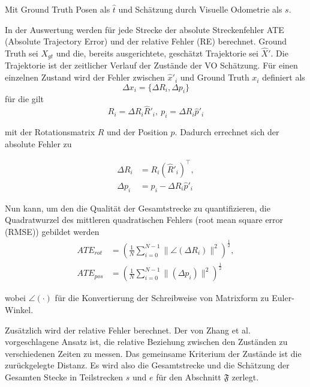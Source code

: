 Mit Ground Truth Posen als $\hat{t}$ und Schätzung durch Visuelle Odometrie als $s$. 
\newline

In der Auswertung werden für jede Strecke der absolute Streckenfehler ATE (Absolute Trajectory Error) und der relative Fehler (RE) berechnet. Ground Truth sei $X_{gt}$ und die, bereits ausgerichtete, geschätzt Trajektorie sei $\hat{X}'$. Die Trajektorie ist der zeitlicher Verlauf der Zustände der VO Schätzung. Für einen einzelnen Zustand wird der Fehler zwischen $\hat{x}'_i$ und Ground Truth $x_i$ definiert als  
\begin{equation}
	\Delta x_i = \{\Delta R_i, \Delta p_i\}
\end{equation}
für die gilt
\begin{equation*}
	R_i = \Delta R_i \hat{R}'_i,\:
	p_i = \Delta R_i \hat{p}'_i	
\end{equation*}

mit der Rotationsmatrix $R$ und der Position $p$. Dadurch errechnet sich der absolute Fehler zu 

\begin{align}
	\Delta R_i &= R_i (\hat{R}'_i)^\top,\\
	\Delta p_i &= p_i - \Delta R_i \hat{p}'_i
	\label{eq:absoluteErr}
\end{align}

Nun kann, um den die Qualität der Gesamtstrecke zu quantifizieren, die Quadratwurzel des mittleren quadratischen Fehlers (root mean square error (RMSE)) gebildet werden
\begin{align}
	ATE_{rot} &= (\frac{1}{N} \sum_{i = 0}^{N-1} \|\angle (\Delta R_i)  \|^2 )^\frac{1}{2},\\
	ATE_{pos} &= (\frac{1}{N} \sum_{i = 0}^{N-1} \| (\Delta p_i)  \|^2 )^\frac{1}{2}
\end{align}

wobei $\angle(\cdot)$ für die Konvertierung der Schreibweise von Matrixform zu Euler-Winkel.
\newline
\newline

Zusätzlich wird der relative Fehler berechnet. Der von Zhang et al. \cite{errorEst} vorgeschlagene Ansatz ist, die relative Beziehung zwischen den Zuständen zu verschiedenen Zeiten zu messen. Das gemeinsame Kriterium der Zustände ist die zurückgelegte Distanz. Es wird also die Gesamtstrecke und die Schätzung der Gesamten Stecke in Teilstrecken $s$ und $e$ für den Abschnitt $\mathfrak{F}$ zerlegt. 
\newline

